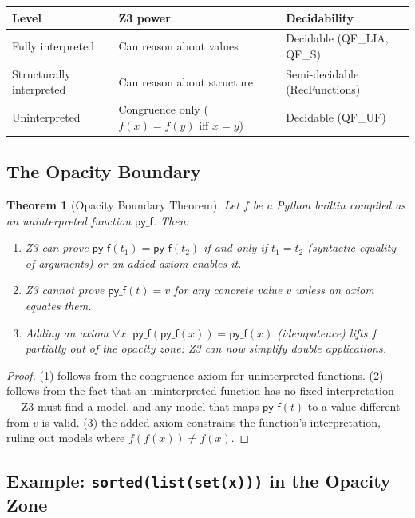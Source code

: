\documentclass[11pt,a4paper]{report}
\theoremstyle{definition}
\theoremstyle{plain}
\newtheorem{theorem}[definition]{Theorem}
\begin{document}
\begin{center}
\begin{tabular}{l l l}
  \textbf{Level} & \textbf{Z3 power} & \textbf{Decidability} \\
  \hline
  Fully interpreted & Can reason about values
    & Decidable (QF\_LIA, QF\_S) \\
  Structurally interpreted & Can reason about structure
    & Semi-decidable (RecFunctions) \\
  Uninterpreted & Congruence only ($f(x) = f(y)$ iff $x = y$)
    & Decidable (QF\_UF) \\
\end{tabular}
\end{center}

\subsection{The Opacity Boundary}

\begin{theorem}[Opacity Boundary Theorem]
\label{thm:opacity}
Let $f$ be a Python builtin compiled as an uninterpreted function
$\mathsf{py\_f}$.  Then:
\begin{enumerate}
  \item Z3 can prove $\mathsf{py\_f}(t_1) = \mathsf{py\_f}(t_2)$
    if and only if $t_1 = t_2$ (syntactic equality of arguments)
    or an added axiom enables it.
  \item Z3 \emph{cannot} prove $\mathsf{py\_f}(t) = v$ for any
    concrete value $v$ unless an axiom equates them.
  \item Adding an axiom $\forall x.\; \mathsf{py\_f}(\mathsf{py\_f}(x))
    = \mathsf{py\_f}(x)$ (idempotence) lifts $f$ partially out of the
    opacity zone: Z3 can now simplify double applications.
\end{enumerate}
\end{theorem}

\begin{proof}
(1) follows from the congruence axiom for uninterpreted functions.
(2) follows from the fact that an uninterpreted function has no
fixed interpretation --- Z3 must find a model, and any model that
maps $\mathsf{py\_f}(t)$ to a value different from $v$ is valid.
(3) the added axiom constrains the function's interpretation,
ruling out models where $f(f(x)) \neq f(x)$.
\end{proof}

\subsection{Example: \texttt{sorted(list(set(x)))} in the Opacity Zone}
\end{document}
